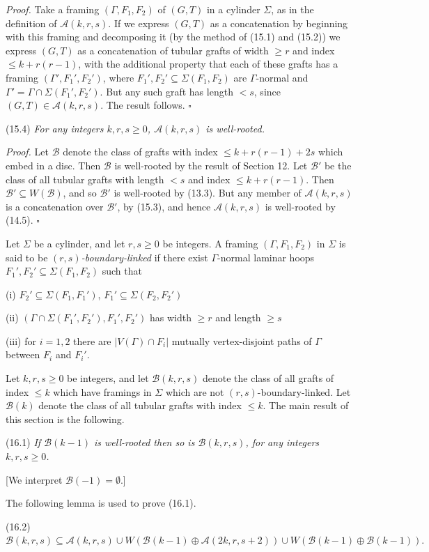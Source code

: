 \textit{Proof.} Take a framing $(\Gamma, F_1, F_2)$ of $(G, T)$ in a cylinder $\Sigma$, as in the definition of $\mathcal{A}(k, r, s)$. If we express $(G, T)$ as a concatenation by beginning with this framing and decomposing it (by the method of (15.1) and (15.2)) we express $(G, T)$ as a concatenation of tubular grafts of width $\ge r$ and index $\le k + r(r - 1)$, with the additional property that each of these grafts has a framing $(\Gamma', F_1', F_2')$, where $F_1', F_2' \subseteq \Sigma(F_1, F_2)$ are $\Gamma$-normal and $\Gamma' = \Gamma \cap \Sigma(F_1', F_2')$. But any such graft has length $< s$, since $(G, T) \in \mathcal{A}(k, r, s)$. The result follows. $\square$

\stmt
(15.4) \textit{For any integers $k, r, s \ge 0$, $\mathcal{A}(k, r, s)$ is well-rooted.}

\textit{Proof.} Let $\mathcal{B}$ denote the class of grafts with index $\le k + r(r - 1) + 2s$ which embed in a disc. Then $\mathcal{B}$ is well-rooted by the result of Section 12. Let $\mathcal{B}'$ be the class of all tubular grafts with length $< s$ and index $\le k + r(r - 1)$. Then $\mathcal{B}' \subseteq W(\mathcal{B})$, and so $\mathcal{B}'$ is well-rooted by (13.3). But any member of $\mathcal{A}(k, r, s)$ is a concatenation over $\mathcal{B}'$, by (15.3), and hence $\mathcal{A}(k, r, s)$ is well-rooted by (14.5). $\square$


Let $\Sigma$ be a cylinder, and let $r, s \ge 0$ be integers. A framing $(\Gamma, F_1, F_2)$ in $\Sigma$ is said to be \textit{$(r, s)$-boundary-linked} if there exist $\Gamma$-normal laminar hoops $F_1', F_2' \subseteq \Sigma(F_1, F_2)$ such that

\hspace*{12pt}(i) $F_2' \subseteq \Sigma(F_1, F_1')$, $F_1' \subseteq \Sigma(F_2, F_2')$

\hspace*{12pt}(ii) $(\Gamma \cap \Sigma(F_1', F_2'), F_1', F_2')$ has width $\ge r$ and length $\ge s$

\hspace*{12pt}(iii) for $i = 1, 2$ there are $|V(\Gamma) \cap F_i|$ mutually vertex-disjoint paths of $\Gamma$ between $F_i$ and $F_i'$.

Let $k, r, s \ge 0$ be integers, and let $\mathcal{B}(k, r, s)$ denote the class of all grafts of index $\le k$ which have framings in $\Sigma$ which are not $(r, s)$-boundary-linked. Let $\mathcal{B}(k)$ denote the class of all tubular grafts with index $\le k$. The main result of this section is the following.

\stmt
(16.1) \textit{If $\mathcal{B}(k - 1)$ is well-rooted then so is $\mathcal{B}(k, r, s)$, for any integers $k, r, s \ge 0$.}

[We interpret $\mathcal{B}(-1) = \emptyset$.]

The following lemma is used to prove (16.1).

\stmt
(16.2) $\mathcal{B}(k, r, s) \subseteq \mathcal{A}(k, r, s) \cup W(\mathcal{B}(k - 1) \oplus \mathcal{A}(2k, r, s + 2)) \cup W(\mathcal{B}(k - 1) \oplus \mathcal{B}(k - 1)).$
